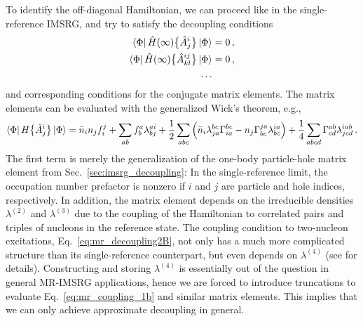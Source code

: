 {To identify the off-diagonal Hamiltonian, we can proceed like in the
single-reference IMSRG, and try to satisfy the decoupling conditions
\begin{align}
  \matrixe{\Phi}{\HO(\infty)\nord{\AO^{i}_{j}}}{\Phi}&=0\,,\label{eq:mr_decoupling1B}\\
  \matrixe{\Phi}{\HO(\infty)\nord{\AO^{ij}_{kl}}}{\Phi}&=0\,,\label{eq:mr_decoupling2B}\\
  \ldots& \notag
\end{align}
and corresponding conditions for the conjugate matrix elements. The 
matrix elements can be evaluated with the generalized Wick's theorem, 
e.g.,
\begin{align}
  \dmatrixe{\Phi}{H\nord{\AO^{i}_{j}}}
  =\nn_i n_j f^{j}_{i}+\sum_{ab}f^{a}_{b}\lambda^{ai}_{bj}
   +\frac{1}{2}\sum_{abc} 
    \left( \nn_i \lambda^{bc}_{ja}\Gamma^{bc}_{ia} - n_j \Gamma^{ja}_{bc} \lambda^{ia}_{bc} \right)
   +\frac{1}{4}\sum_{abcd}\Gamma^{ab}_{cd}\lambda^{iab}_{jcd}\,.\label{eq:mr_coupling_1b}
\end{align}
The first term is merely the generalization of the one-body
particle-hole matrix element from Sec.~\ref{sec:imsrg_decoupling}: In the 
single-reference limit, the occupation number prefactor is nonzero if $i$ and
$j$ are particle and hole indices, respectively. In addition, the matrix
element depends on the irreducible densities $\lambda^{(2)}$ and $\lambda^{(3)}$
due to the coupling of the Hamiltonian to correlated pairs and triples of nucleons 
in the reference state. The coupling condition to two-nucleon excitations, 
Eq.~\eqref{eq:mr_decoupling2B}, not only has a much more complicated 
structure than its single-reference counterpart, but even depends
on $\lambda^{(4)}$ (see \cite{Hergert:2017kx} for details).
Constructing and storing $\lambda^{(4)}$ is essentially out
of the question in general MR-IMSRG applications, hence we 
are forced to introduce truncations to evaluate Eq.~\eqref{eq:mr_coupling_1b} 
and similar matrix elements. This implies that we can only
achieve approximate decoupling in general.

}
